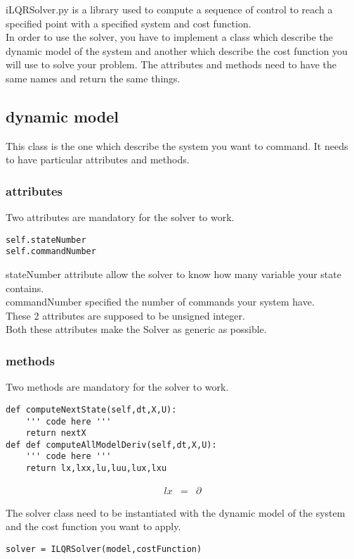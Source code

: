 \documentclass[10pt,a4paper]{report}
\begin{document}
iLQRSolver.py is a library used to compute a sequence of control to reach a specified point with a specified system and cost function.
\\
In order to use the solver, you have to implement a class which describe the dynamic model of the system and another which describe the cost function you will use to solve your problem.
The attributes and methods need to have the same names and return the same things.
\subsection*{dynamic model}
This class is the one which describe the system you want to command. It needs to have particular attributes and methods.
\subsubsection*{attributes}
Two attributes are mandatory for the solver to work.
\begin{verbatim}
self.stateNumber
self.commandNumber
\end{verbatim}
stateNumber attribute allow the solver to know how many variable your state contains.\\ 
commandNumber specified the number of commands your system have.\\
These 2 attributes are supposed to be unsigned integer.\\
Both these attributes make the Solver as generic as possible.
\subsubsection*{methods}
Two methods are mandatory for the solver to work.
\begin{verbatim}
def computeNextState(self,dt,X,U):
	''' code here '''
	return nextX
def def computeAllModelDeriv(self,dt,X,U):
	''' code here '''
	return lx,lxx,lu,luu,lux,lxu

\end{verbatim}
 
\begin{eqnarray}
lx &=& \partial  
\end{eqnarray}








The solver class need to be instantiated with the dynamic model of the system and the cost function you want to apply.
\begin{verbatim}
solver = ILQRSolver(model,costFunction)
\end{verbatim}
\end{document}
